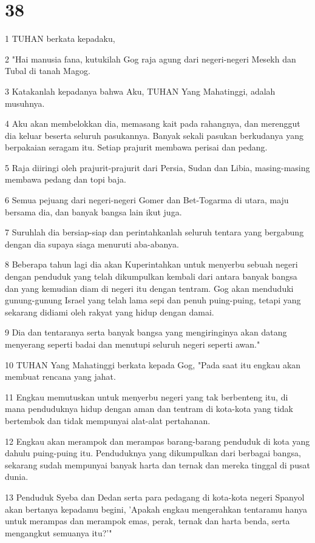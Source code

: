 \chapter{38}

\par 1 TUHAN berkata kepadaku,
\par 2 "Hai manusia fana, kutukilah Gog raja agung dari negeri-negeri Mesekh dan Tubal di tanah Magog.
\par 3 Katakanlah kepadanya bahwa Aku, TUHAN Yang Mahatinggi, adalah musuhnya.
\par 4 Aku akan membelokkan dia, memasang kait pada rahangnya, dan merenggut dia keluar beserta seluruh pasukannya. Banyak sekali pasukan berkudanya yang berpakaian seragam itu. Setiap prajurit membawa perisai dan pedang.
\par 5 Raja diiringi oleh prajurit-prajurit dari Persia, Sudan dan Libia, masing-masing membawa pedang dan topi baja.
\par 6 Semua pejuang dari negeri-negeri Gomer dan Bet-Togarma di utara, maju bersama dia, dan banyak bangsa lain ikut juga.
\par 7 Suruhlah dia bersiap-siap dan perintahkanlah seluruh tentara yang bergabung dengan dia supaya siaga menuruti aba-abanya.
\par 8 Beberapa tahun lagi dia akan Kuperintahkan untuk menyerbu sebuah negeri dengan penduduk yang telah dikumpulkan kembali dari antara banyak bangsa dan yang kemudian diam di negeri itu dengan tentram. Gog akan menduduki gunung-gunung Israel yang telah lama sepi dan penuh puing-puing, tetapi yang sekarang didiami oleh rakyat yang hidup dengan damai.
\par 9 Dia dan tentaranya serta banyak bangsa yang mengiringinya akan datang menyerang seperti badai dan menutupi seluruh negeri seperti awan."
\par 10 TUHAN Yang Mahatinggi berkata kepada Gog, "Pada saat itu engkau akan membuat rencana yang jahat.
\par 11 Engkau memutuskan untuk menyerbu negeri yang tak berbenteng itu, di mana penduduknya hidup dengan aman dan tentram di kota-kota yang tidak bertembok dan tidak mempunyai alat-alat pertahanan.
\par 12 Engkau akan merampok dan merampas barang-barang penduduk di kota yang dahulu puing-puing itu. Penduduknya yang dikumpulkan dari berbagai bangsa, sekarang sudah mempunyai banyak harta dan ternak dan mereka tinggal di pusat dunia.
\par 13 Penduduk Syeba dan Dedan serta para pedagang di kota-kota negeri Spanyol akan bertanya kepadamu begini, 'Apakah engkau mengerahkan tentaramu hanya untuk merampas dan merampok emas, perak, ternak dan harta benda, serta mengangkut semuanya itu?'"

